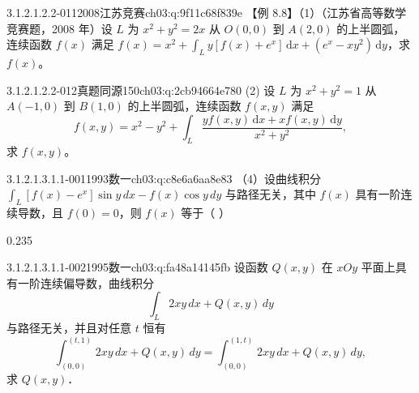 \begin{q}{3.1.2.1.2.2-011}{2008江苏竞赛}{ch03:q:9f11c68f839e}
【例 8.8】（1）（江苏省高等数学竞赛题，2008 年）设 $L$ 为 $x^2+y^2=2x$ 从 $O(0,0)$ 到 $A(2,0)$ 的上半圆弧，连续函数 $f(x)$ 满足 $\displaystyle f(x)=x^2+\int_L y[f(x)+e^x]\,\mathrm{d}x+(e^x-xy^2)\,\mathrm{d}y$，求 $f(x)$。
\end{q}

\begin{q}{3.1.2.1.2.2-012}{真题同源150}{ch03:q:2cb94664e780}
(2) 设 $L$ 为 $x^2+y^2=1$ 从 $A(-1,0)$ 到 $B(1,0)$ 的上半圆弧，连续函数 $f(x,y)$ 满足
\[
f(x,y)=x^2-y^2+\int_L \frac{y f(x,y)\,\mathrm{d}x+x f(x,y)\,\mathrm{d}y}{x^2+y^2},
\]
求 $f(x,y)$。
\end{q}

\par\addvspace{2.4ex}\noindent
\begin{minipage}{\linewidth}



\begin{q}{3.1.2.1.3.1.1-001}{1993数一}{ch03:q:c8e6a6aa8e83}
（4）设曲线积分 $\displaystyle \int_L [f(x)-e^x]\sin y\,dx - f(x)\cos y\,dy$ 与路径无关，其中 $f(x)$ 具有一阶连续导数，且 $f(0)=0$，则 $f(x)$ 等于（  ）
\begin{opts}{0.235}
\hfill{}\hfill{}\hfill{}
\end{opts}
\end{q}
\end{minipage}


\begin{q}{3.1.2.1.3.1.1-002}{1995数一}{ch03:q:fa48a14145fb}
设函数 $Q(x,y)$ 在 $xOy$ 平面上具有一阶连续偏导数，曲线积分
\[
\int_L 2xy\,dx+Q(x,y)\,dy
\]
与路径无关，并且对任意 $t$ 恒有
\[
\int_{(0,0)}^{(t,1)} 2xy\,dx+Q(x,y)\,dy=\int_{(0,0)}^{(1,t)} 2xy\,dx+Q(x,y)\,dy,
\]
求 $Q(x,y)$．
\end{q}

